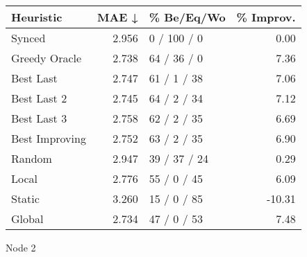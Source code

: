 \begin{tabular}{lrlr}
\toprule
\textbf{Heuristic} & \textbf{MAE ↓} & \textbf{\% Be/Eq/Wo} & \textbf{\% Improv.} \\
\midrule
            Synced &          2.956 &          0 / 100 / 0 &                0.00 \\
     Greedy Oracle &          2.738 &          64 / 36 / 0 &                7.36 \\
         Best Last &          2.747 &          61 / 1 / 38 &                7.06 \\
       Best Last 2 &          2.745 &          64 / 2 / 34 &                7.12 \\
       Best Last 3 &          2.758 &          62 / 2 / 35 &                6.69 \\
    Best Improving &          2.752 &          63 / 2 / 35 &                6.90 \\
            Random &          2.947 &         39 / 37 / 24 &                0.29 \\
             Local &          2.776 &          55 / 0 / 45 &                6.09 \\
            Static &          3.260 &          15 / 0 / 85 &              -10.31 \\
            Global &          2.734 &          47 / 0 / 53 &                7.48 \\
\bottomrule
\end{tabular}
\caption{Node 2}
\label{tab:ds_iid_lr01_le1_bs4_2}
